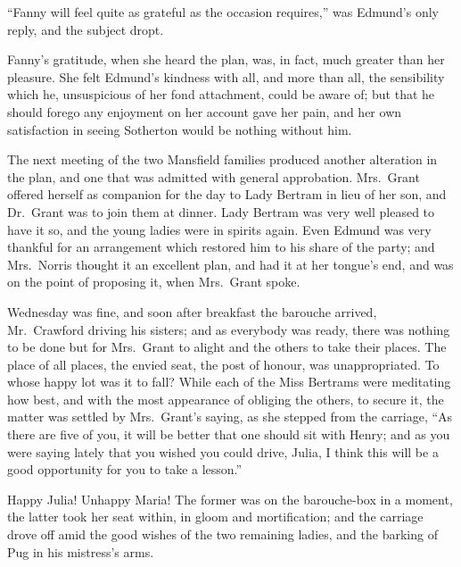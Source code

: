 \documentclass{article}
\begin{document}
``Fanny will feel quite as grateful as the occasion requires,''
was Edmund's only reply, and the subject dropt.

Fanny's gratitude, when she heard the plan, was, in fact,
much greater than her pleasure.  She felt Edmund's kindness
with all, and more than all, the sensibility which he,
unsuspicious of her fond attachment, could be aware of;
but that he should forego any enjoyment on her account gave
her pain, and her own satisfaction in seeing Sotherton would
be nothing without him.

The next meeting of the two Mansfield families produced
another alteration in the plan, and one that was admitted
with general approbation.  Mrs.\ Grant offered herself as
companion for the day to Lady Bertram in lieu of her son,
and Dr.\ Grant was to join them at dinner.  Lady Bertram
was very well pleased to have it so, and the young ladies
were in spirits again.  Even Edmund was very thankful for an
arrangement which restored him to his share of the party;
and Mrs.\ Norris thought it an excellent plan, and had it
at her tongue's end, and was on the point of proposing it,
when Mrs.\ Grant spoke.

Wednesday was fine, and soon after breakfast the barouche
arrived, Mr.\ Crawford driving his sisters; and as everybody
was ready, there was nothing to be done but for Mrs.\ Grant
to alight and the others to take their places.  The place
of all places, the envied seat, the post of honour,
was unappropriated.  To whose happy lot was it to fall?
While each of the Miss Bertrams were meditating how best,
and with the most appearance of obliging the others,
to secure it, the matter was settled by Mrs.\ Grant's saying,
as she stepped from the carriage, ``As there are five
of you, it will be better that one should sit with Henry;
and as you were saying lately that you wished you
could drive, Julia, I think this will be a good opportunity
for you to take a lesson.''

Happy Julia!  Unhappy Maria!  The former was on the
barouche-box in a moment, the latter took her seat within,
in gloom and mortification; and the carriage drove
off amid the good wishes of the two remaining ladies,
and the barking of Pug in his mistress's arms.
\end{document}
